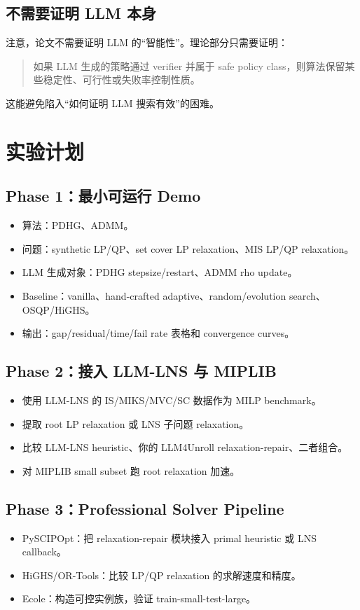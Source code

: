 \documentclass[12pt,a4paper]{ctexart}
\begin{document}
\subsection{不需要证明 LLM 本身}
注意，论文不需要证明 LLM 的“智能性”。理论部分只需要证明：
\begin{quote}
如果 LLM 生成的策略通过 verifier 并属于 safe policy class，则算法保留某些稳定性、可行性或失败率控制性质。
\end{quote}
这能避免陷入“如何证明 LLM 搜索有效”的困难。

\section{实验计划}

\subsection{Phase 1：最小可运行 Demo}
\begin{itemize}
    \item 算法：PDHG、ADMM。
    \item 问题：synthetic LP/QP、set cover LP relaxation、MIS LP/QP relaxation。
    \item LLM 生成对象：PDHG stepsize/restart、ADMM rho update。
    \item Baseline：vanilla、hand-crafted adaptive、random/evolution search、OSQP/HiGHS。
    \item 输出：gap/residual/time/fail rate 表格和 convergence curves。
\end{itemize}

\subsection{Phase 2：接入 LLM-LNS 与 MIPLIB}
\begin{itemize}
    \item 使用 LLM-LNS 的 IS/MIKS/MVC/SC 数据作为 MILP benchmark。
    \item 提取 root LP relaxation 或 LNS 子问题 relaxation。
    \item 比较 LLM-LNS heuristic、你的 LLM4Unroll relaxation-repair、二者组合。
    \item 对 MIPLIB small subset 跑 root relaxation 加速。
\end{itemize}

\subsection{Phase 3：Professional Solver Pipeline}
\begin{itemize}
    \item PySCIPOpt：把 relaxation-repair 模块接入 primal heuristic 或 LNS callback。
    \item HiGHS/OR-Tools：比较 LP/QP relaxation 的求解速度和精度。
    \item Ecole：构造可控实例族，验证 train-small-test-large。
\end{itemize}
\end{document}
